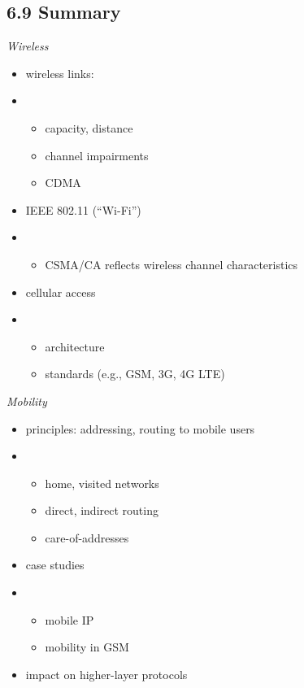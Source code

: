 \documentclass[
]{article}
\begin{document}
\hypertarget{69-summary}{%
\subsection{6.9 Summary}\label{69-summary}}

\emph{Wireless}

\begin{itemize}
\item
  wireless links:
\item
  \begin{itemize}
  \item
    capacity, distance
  \item
    channel impairments
  \item
    CDMA
  \end{itemize}
\item
  IEEE 802.11 (``Wi-Fi'')
\item
  \begin{itemize}
  \item
    CSMA/CA reflects wireless channel characteristics
  \end{itemize}
\item
  cellular access
\item
  \begin{itemize}
  \item
    architecture
  \item
    standards (e.g., GSM, 3G, 4G LTE)
  \end{itemize}
\end{itemize}

\emph{Mobility}

\begin{itemize}
\item
  principles: addressing, routing to mobile users
\item
  \begin{itemize}
  \item
    home, visited networks
  \item
    direct, indirect routing
  \item
    care-of-addresses
  \end{itemize}
\item
  case studies
\item
  \begin{itemize}
  \item
    mobile IP
  \item
    mobility in GSM
  \end{itemize}
\item
  impact on higher-layer protocols
\end{itemize}
\end{document}
